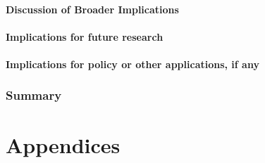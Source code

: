 \documentclass[pdftex,12pt]{llncs}
\begin{document}
\subsection{Discussion of Broader Implications}

\subsection{Implications for future research}

\subsection{Implications for policy or other applications, if any}

\section{Summary} 

\printbibliography
%
%


\part{Appendices}
%
%
%
\end{document}
